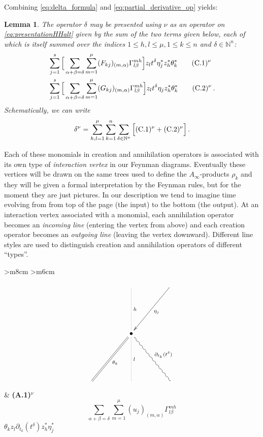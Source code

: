\documentclass[english,letter paper,12pt,leqno]{article}
\newtheorem{lemma}[theorem]{Lemma}
\theoremstyle{example}
\numberwithin{equation}{section}
\def\be{\begin{equation}}
\def\ee{\end{equation}}
\begin{document}
Combining \eqref{eq:delta_formula} and \eqref{eq:partial_derivative_op} yields:

\begin{lemma}
The operator $\delta$ may be presented using $\nu$ as an operator on \eqref{eq:presentationHHalt} given by the sum of the two terms given below, each of which is itself summed over the indices $1 \le h,l \le \mu, 1 \le k \le n$ and $\delta \in \mathbb{N}^n$:
\begin{align}
& \sum_{j=1}^s \Big[ \sum_{\alpha + \beta = \delta } \sum_{m=1}^\mu (F_{kj})_{(m,\alpha)} \Gamma^{m h}_{l \beta} \Big] z_{l} t^\delta \eta_j^* z_h^* \theta_k^* \qquad (\textup{C}.1)^{\nu}\label{eq:c1vertex}\\
& \sum_{j=1}^s \Big[ \sum_{\alpha + \beta = \delta } \sum_{m=1}^\mu (G_{kj})_{(m,\alpha)} \Gamma^{m h}_{l \beta} \Big] z_{l} t^\delta \eta_j z_h^* \theta_k^* \qquad (\textup{C}.2)^{\nu}\,.\label{eq:c2vertex}
\end{align}
Schematically, we can write
\be
\delta^\nu = \sum_{h,l=1}^\mu \sum_{k=1}^n\sum_{\delta \in \mathbb{N}^n} \Big[ (\textup{C}.1)^{\nu} + (\textup{C}.2)^{\nu} \Big]\,.
\ee
\end{lemma}

Each of these monomials in creation and annihilation operators is associated with its own type of \emph{interaction vertex} in our Feynman diagrams. Eventually these vertices will be drawn on the same trees used to define the $A_\infty$-products $\rho_k$ and they will be given a formal interpretation by the Feynman rules, but for the moment they are just pictures. In our description we tend to imagine time evolving from from top of the page (the input) to the bottom (the output). At an interaction vertex associated with a monomial, each annihilation operator becomes an \emph{incoming line} (entering the vertex from above) and each creation operator becomes an \emph{outgoing line} (leaving the vertex downward). Different line styles are used to distinguish creation and annihilation operators of different ``types''.

\begin{center}
\begin{tabular}{ >{\centering}m{8cm} >{\centering}m{6cm} }
\[
\xymatrix@C+2pc@R+3pc{
& \ar@{.}[d]^-{h} & \ar[dl]^-{\eta_j}\\
& \bullet \ar@{=}[dl]^-{\theta_k} \ar@{.}[d]^-{l} \ar@{~}[dr]^-{\partial_{t_k}(t^\delta)}\\
& &
}
\]
&
\textbf{(A.1)${}^\nu$}
\vspace{1cm}
\[\sum_{\alpha + \beta = \delta } \sum_{m=1}^\mu (u_j)_{(m,\alpha)} \Gamma^{m h}_{l \beta}\]
\vspace{0.5cm}
$\theta_k z_{l} \partial_{t_k}(t^\delta) z_h^* \eta_j^*$
\end{tabular}
\end{center}
\end{document}
